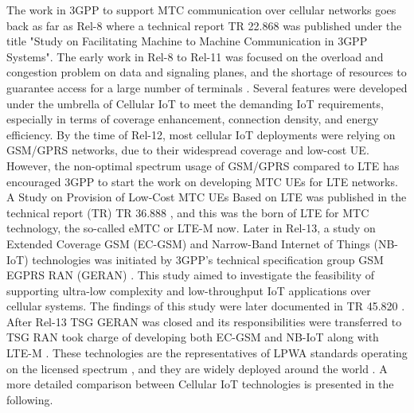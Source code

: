 \documentclass[]{IEEEtran}
\begin{document}
The work in 3GPP to support MTC communication over cellular networks goes back as far as Rel-8 where a technical report TR 22.868 \cite{TR_22.868} was published under the title "Study on Facilitating Machine to Machine Communication in 3GPP Systems". The early work in Rel-8 to Rel-11 was focused on the overload and congestion problem on data and signaling planes, and the shortage of resources to guarantee access for a large number of terminals \cite{benhiba_comparative_2018}. Several features were developed under the umbrella of Cellular IoT to meet the demanding IoT requirements, especially in terms of coverage enhancement, connection density, and energy efficiency. 
By the time of Rel-12, most cellular IoT deployments were relying on GSM/GPRS networks, due to their widespread coverage and low-cost UE. However, the non-optimal spectrum usage of GSM/GPRS compared to LTE has encouraged 3GPP to start the work on developing MTC UEs for LTE networks. A Study on Provision of Low-Cost MTC UEs Based on LTE was published in the technical report (TR) TR 36.888 \cite{TR_36.888}, and this was the born of LTE for MTC technology, the so-called eMTC or LTE-M now.
Later in Rel-13, a study on Extended Coverage GSM (EC-GSM) and  Narrow-Band Internet of Things (NB-IoT) technologies was initiated by 3GPP's technical specification group GSM EGPRS RAN (GERAN) \cite{liberg_cellular_2019}. This study aimed to investigate the feasibility of supporting ultra-low complexity and low-throughput IoT applications over cellular systems. The findings of this study were later documented in TR 45.820 \cite{TR_45.820}.
After Rel-13 TSG GERAN was closed and its responsibilities were transferred to TSG RAN took charge of developing both EC-GSM and NB-IoT along with LTE-M \cite{liberg_cellular_2019}. These technologies are the representatives of LPWA standards operating on the licensed spectrum \cite{adelantado2017understanding}, and they are widely deployed around the world \cite{noauthor_mobile_nodate}. A more detailed comparison between Cellular IoT technologies is presented in the following.
\end{document}
